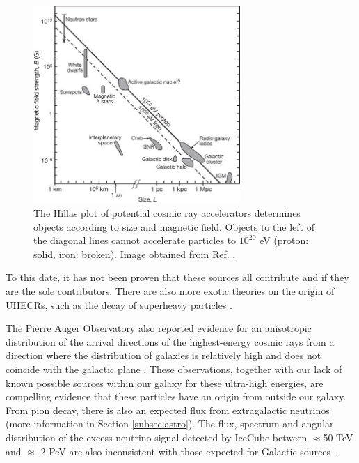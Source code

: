 \begin{figure}
\centering
\includegraphics[width = 0.7\textwidth]{chapter3/img/Hillas.jpg}
\caption{The Hillas plot of potential cosmic ray accelerators determines objects according to size and magnetic field. Objects to the left of the diagonal lines cannot accelerate particles to $10^{20}$ eV (proton: solid, iron: broken). Image obtained from Ref. \cite{Bauleo:2009zz}.}
\label{fig:hillas}
\end{figure}

To this date, it has not been proven that these sources all contribute and if they are the sole contributors. There are also more exotic theories on the origin of UHECRs, such as the decay of superheavy particles \cite{Nagano:2000ve}.



The Pierre Auger Observatory also reported evidence for an anisotropic distribution of the arrival directions of the highest-energy cosmic rays from a direction where the distribution of galaxies is relatively high and does not coincide with the galactic plane \cite{Aab:2017tyv}. These observations, together with our lack of known possible sources within our galaxy for these ultra-high energies, are compelling evidence that these particles have an origin from outside our galaxy. From pion decay, there is also an expected flux from extragalactic neutrinos (more information in Section \ref{subsec:astro}). The flux, spectrum and angular distribution of the excess neutrino signal detected by IceCube between $\approx$50 TeV and $\approx$ 2 PeV are also inconsistent with those expected for Galactic sources \cite{Waxman:2013zda}.\\


